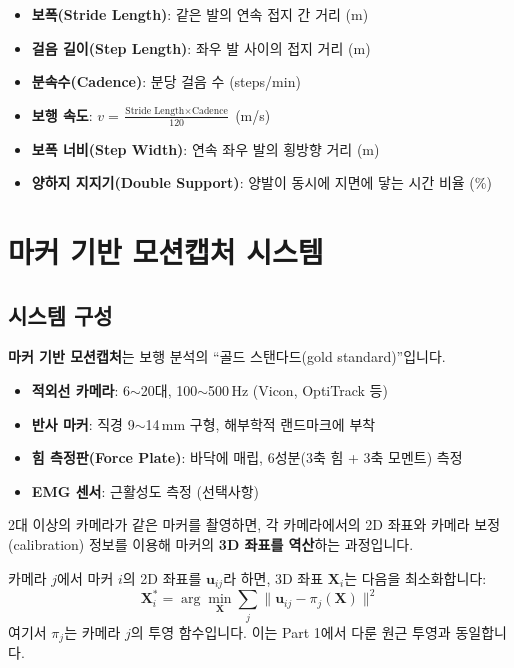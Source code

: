 \documentclass[11pt, a4paper]{report}
\begin{document}
\begin{biomechbox}[title={주요 시공간 보행 파라미터}]
\begin{itemize}[leftmargin=*]
  \item \textbf{보폭(Stride Length)}: 같은 발의 연속 접지 간 거리 (m)
  \item \textbf{걸음 길이(Step Length)}: 좌우 발 사이의 접지 거리 (m)
  \item \textbf{분속수(Cadence)}: 분당 걸음 수 (steps/min)
  \item \textbf{보행 속도}: $v = \frac{\text{Stride Length} \times \text{Cadence}}{120}$ (m/s)
  \item \textbf{보폭 너비(Step Width)}: 연속 좌우 발의 횡방향 거리 (m)
  \item \textbf{양하지 지지기(Double Support)}: 양발이 동시에 지면에 닿는 시간 비율 (\%)
\end{itemize}
\end{biomechbox}


\section{마커 기반 모션캡처 시스템}
\label{sec:marker_based}

\subsection{시스템 구성}

\textbf{마커 기반 모션캡처}는 보행 분석의 ``골드 스탠다드(gold standard)''입니다.

\begin{itemize}[leftmargin=*]
  \item \textbf{적외선 카메라}: 6$\sim$20대, 100$\sim$500\,Hz (Vicon, OptiTrack 등)
  \item \textbf{반사 마커}: 직경 9$\sim$14\,mm 구형, 해부학적 랜드마크에 부착
  \item \textbf{힘 측정판(Force Plate)}: 바닥에 매립, 6성분(3축 힘 + 3축 모멘트) 측정
  \item \textbf{EMG 센서}: 근활성도 측정 (선택사항)
\end{itemize}

\begin{definition}
2대 이상의 카메라가 같은 마커를 촬영하면, 각 카메라에서의 2D 좌표와 카메라 보정(calibration) 정보를 이용해 마커의 \textbf{3D 좌표를 역산}하는 과정입니다.

카메라 $j$에서 마커 $i$의 2D 좌표를 $\mathbf{u}_{ij}$라 하면, 3D 좌표 $\mathbf{X}_i$는 다음을 최소화합니다:
\begin{equation}
\mathbf{X}_i^* = \arg\min_{\mathbf{X}} \sum_{j} \| \mathbf{u}_{ij} - \pi_j(\mathbf{X}) \|^2
\end{equation}
여기서 $\pi_j$는 카메라 $j$의 투영 함수입니다. 이는 Part 1에서 다룬 원근 투영과 동일합니다.
\end{definition}
\end{document}
